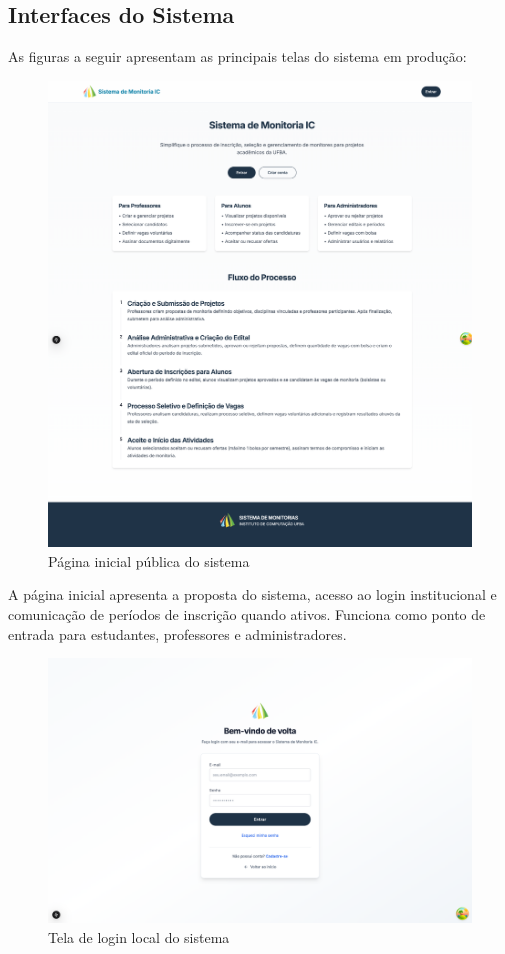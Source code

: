 \documentclass[portuguese]{sbc2025}%
\begin{document}
\subsection{Interfaces do Sistema}

As figuras a seguir apresentam as principais telas do sistema em produção:

\begin{figure}[h!]
  \centering
  \includegraphics[width=\linewidth]{images/monitoria/landing.png}
  \caption{Página inicial pública do sistema}
  \label{fig:landing}
\end{figure}

A página inicial apresenta a proposta do sistema, acesso ao login institucional e comunicação de períodos de inscrição quando ativos. Funciona como ponto de entrada para estudantes, professores e administradores.

\begin{figure}[h!]
  \centering
  \includegraphics[width=\linewidth]{images/monitoria/login.png}
  \caption{Tela de login local do sistema}
  \label{fig:login}
\end{figure}
\end{document}
